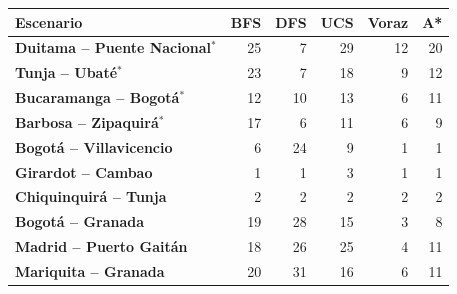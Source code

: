 \renewcommand{\arraystretch}{1.2}
\begin{tabular}{|l|r|r|r|r|r|}
\hline
\rowcolor{gray!20} \textbf{Escenario} & \textbf{BFS} & \textbf{DFS} & \textbf{UCS} & \textbf{Voraz} & \textbf{A*} \\
\hline
\textbf{Duitama -- Puente Nacional$^{*}$} & 25 & 7 & 29 & 12 & 20 \\
\hline
\textbf{Tunja -- Ubaté$^{*}$} & 23 & 7 & 18 & 9 & 12 \\
\hline
\textbf{Bucaramanga -- Bogotá$^{*}$} & 12 & 10 & 13 & 6 & 11 \\
\hline
\textbf{Barbosa -- Zipaquirá$^{*}$} & 17 & 6 & 11 & 6 & 9 \\
\hline
\textbf{Bogotá -- Villavicencio} & 6 & 24 & 9 & 1 & 1 \\
\hline
\textbf{Girardot -- Cambao} & 1 & 1 & 3 & 1 & 1 \\
\hline
\textbf{Chiquinquirá -- Tunja} & 2 & 2 & 2 & 2 & 2 \\
\hline
\textbf{Bogotá -- Granada} & 19 & 28 & 15 & 3 & 8 \\
\hline
\textbf{Madrid -- Puerto Gaitán} & 18 & 26 & 25 & 4 & 11 \\
\hline
\textbf{Mariquita -- Granada} & 20 & 31 & 16 & 6 & 11 \\
\hline
\end{tabular}
